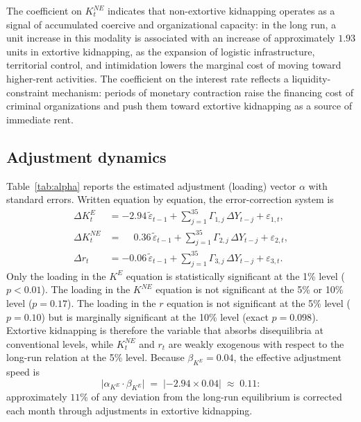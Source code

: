 \documentclass[ecta,nameyear,final,supplement]{econsocart}
\numberwithin{equation}{section}
\numberwithin{table}{section}
\theoremstyle{definition}
\newcommand{\KE}{K^{E}}
\newcommand{\KNE}{K^{NE}}
\begin{document}
The coefficient on $\KNE_t$ indicates that non-extortive kidnapping operates
as a signal of accumulated coercive and organizational capacity: in the long
run, a unit increase in this modality is associated with an increase of
approximately $1.93$ units in extortive kidnapping, as the expansion of
logistic infrastructure, territorial control, and intimidation lowers the
marginal cost of moving toward higher-rent activities. The coefficient on
the interest rate reflects a liquidity-constraint mechanism: periods of
monetary contraction raise the financing cost of criminal organizations and
push them toward extortive kidnapping as a source of immediate rent.

\subsection{Adjustment dynamics}

Table~\ref{tab:alpha} reports the estimated adjustment (loading) vector
$\alpha$ with standard errors. Written equation by equation, the
error-correction system is
\begin{align}
\Delta \KE_t  &= -2.94\,\tilde\varepsilon_{t-1}
 + \textstyle\sum_{j=1}^{35}\Gamma_{1,j}\,\Delta Y_{t-j} + \varepsilon_{1,t},
\label{eq:vec1}\\
\Delta \KNE_t &= \phantom{-}0.36\,\tilde\varepsilon_{t-1}
 + \textstyle\sum_{j=1}^{35}\Gamma_{2,j}\,\Delta Y_{t-j} + \varepsilon_{2,t},
\label{eq:vec2}\\
\Delta r_t    &= -0.06\,\tilde\varepsilon_{t-1}
 + \textstyle\sum_{j=1}^{35}\Gamma_{3,j}\,\Delta Y_{t-j} + \varepsilon_{3,t}.
\label{eq:vec3}
\end{align}
Only the loading in the $\KE$ equation is statistically significant at the
1\% level ($p<0.01$). The loading in the $\KNE$ equation is not significant
at the 5\% or 10\% level ($p=0.17$). The loading in the $r$ equation is not
significant at the 5\% level ($p=0.10$) but is marginally significant at the
10\% level (exact $p=0.098$). Extortive kidnapping is therefore the variable
that absorbs disequilibria at conventional levels, while $\KNE_t$ and $r_t$
are weakly exogenous with respect to the long-run relation at the 5\% level.
Because $\beta_{\KE} = 0.04$, the effective
adjustment speed is
\begin{equation}
\bigl|\alpha_{\KE}\cdot\beta_{\KE}\bigr| \;=\;
\lvert -2.94 \times 0.04\rvert \;\approx\; 0.11 :
\label{eq:speed}
\end{equation}
approximately $11\%$ of any deviation from the long-run equilibrium is
corrected each month through adjustments in extortive kidnapping.
\end{document}

